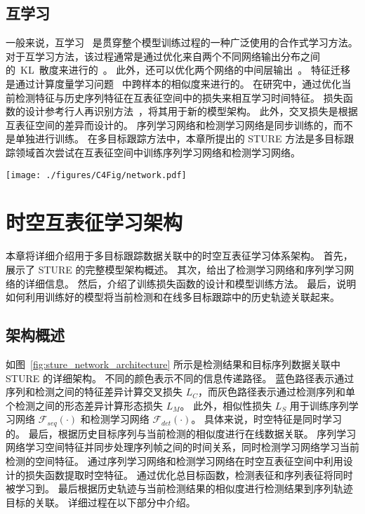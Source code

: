 \subsection{互学习}
一般来说，互学习~\cite{RN979,hinton2015distilling,romero2015fitnets,RN982} 是贯穿整个模型训练过程的一种广泛使用的合作式学习方法。
对于互学习方法，该过程通常是通过优化来自两个不同网络输出分布之间的~KL~散度来进行的~\cite{hinton2015distilling,RN983}。
此外，还可以优化两个网络的中间层输出~\cite{romero2015fitnets}。
特征迁移是通过计算度量学习问题~\cite{RN982, RN984} 中跨样本的相似度来进行的。
在研究中，通过优化当前检测特征与历史序列特征在互表征空间中的损失来相互学习时间特征。
损失函数的设计参考行人再识别方法~\cite{RN927}，将其用于新的模型架构。
此外，交叉损失是根据互表征空间的差异而设计的。
序列学习网络和检测学习网络是同步训练的，而不是单独进行训练。
在多目标跟踪方法中，本章所提出的 STURE 方法是多目标跟踪领域首次尝试在互表征空间中训练序列学习网络和检测学习网络。


\vspace{0.5em}
\begin{figure*}[ht]
	\centering
	\texttt{[image: ./figures/C4Fig/network.pdf]}
	\vspace{0.2em}
	\caption{多目标跟踪数据关联中 STURE 方法的体系结构}
	\label{fig:sture_network_architecture}
\end{figure*}

 

\section{时空互表征学习架构}
本章将详细介绍用于多目标跟踪数据关联中的时空互表征学习体系架构。
首先，展示了 STURE 的完整模型架构概述。
其次，给出了检测学习网络和序列学习网络的详细信息。
然后，介绍了训练损失函数的设计和模型训练方法。
最后，说明如何利用训练好的模型将当前检测和在线多目标跟踪中的历史轨迹关联起来。

\subsection{架构概述}
如图~\ref{fig:sture_network_architecture} 所示是检测结果和目标序列数据关联中 STURE 的详细架构。
不同的颜色表示不同的信息传递路径。
蓝色路径表示通过序列和检测之间的特征差异计算交叉损失 $L_C$，而灰色路径表示通过检测序列和单个检测之间的形态差异计算形态损失 $L_M$。
此外，相似性损失 $L_S$ 用于训练序列学习网络 $\mathcal{F}_{seq}(\cdot)$ 和检测学习网络 $\mathcal{F}_{det}(\cdot)$。
具体来说，时空特征是同时学习的。
最后，根据历史目标序列与当前检测的相似度进行在线数据关联。
序列学习网络学习空间特征并同步处理序列帧之间的时间关系，同时检测学习网络学习当前检测的空间特征。
通过序列学习网络和检测学习网络在时空互表征空间中利用设计的损失函数提取时空特征。
通过优化总目标函数，检测表征和序列表征将同时被学习到。
最后根据历史轨迹与当前检测结果的相似度进行检测结果到序列轨迹目标的关联。
详细过程在以下部分中介绍。


